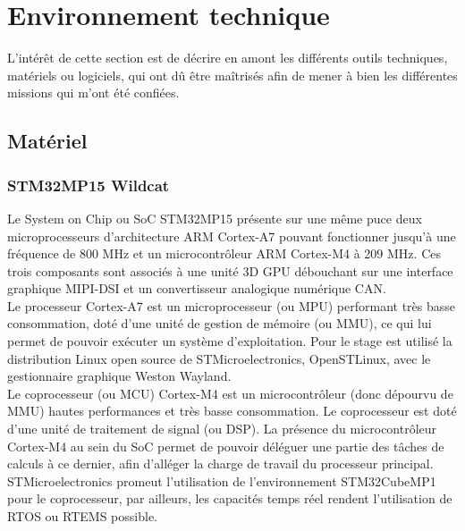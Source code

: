 
\section{Environnement technique}
\label{chp:part2:technical_environment}

L'intérêt de cette section est de décrire en amont les différents outils
techniques, matériels ou logiciels, qui ont dû être maîtrisés afin de mener à
bien les différentes missions qui m'ont été confiées.

\subsection{Matériel}
\label{chp:part2:subsct:hardware}

\subsubsection{STM32MP15 Wildcat}
\label{sec:wildcat_evalboard}

Le System on Chip ou SoC STM32MP15 présente sur une même puce  deux
microprocesseurs d’architecture ARM Cortex-A7 pouvant fonctionner jusqu'à une
fréquence de 800 MHz et un microcontrôleur ARM Cortex-M4 à 209 MHz. Ces trois
composants sont associés à une unité 3D GPU débouchant sur une interface
graphique MIPI-DSI et un convertisseur analogique numérique CAN.\\

Le processeur Cortex-A7 est un microprocesseur (ou MPU) performant très basse
consommation, doté d’une unité de gestion de mémoire (ou MMU), ce qui lui
permet de pouvoir exécuter un système d’exploitation. Pour le stage est
utilisé la distribution Linux open source de STMicroelectronics, OpenSTLinux,
avec le gestionnaire graphique Weston Wayland. \\

Le coprocesseur (ou MCU) Cortex-M4 est un microcontrôleur (donc dépourvu de
MMU) hautes performances et très basse consommation. Le coprocesseur est doté
d’une unité de traitement de signal (ou DSP). La présence du microcontrôleur
Cortex-M4 au sein du SoC permet de pouvoir déléguer une partie des tâches de
calculs à ce dernier, afin d’alléger la charge de travail du processeur
principal. STMicroelectronics promeut l’utilisation de l’environnement
STM32CubeMP1 pour le coprocesseur, par ailleurs, les capacités temps réel
rendent l’utilisation de RTOS ou RTEMS possible. \\

